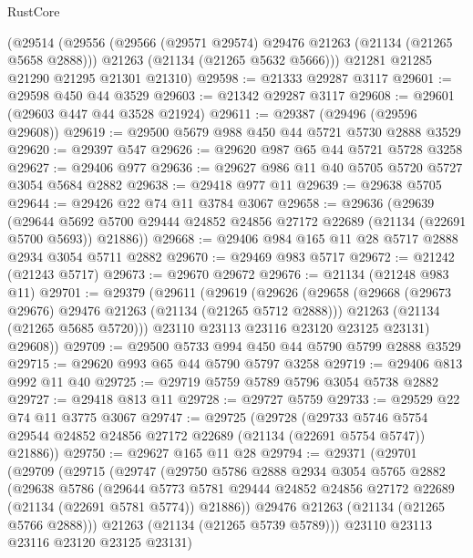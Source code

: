 \begin{lexlean}{RustCore}
\begin{coremodule}
    (@29514
      (@29556
        (@29566 (@29571 @29574) @29476 @21263 (@21134 (@21265 @5658 @2888)))
        @21263
        (@21134 (@21265 @5632 @5666)))
      @21281
      @21285
      @21290
      @21295
      @21301
      @21310)
@29598 := @21333 @29287 @3117
@29601 := @29598 @450 @44 @3529
@29603 := @21342 @29287 @3117
@29608 := @29601 (@29603 @447 @44 @3528 @21924)
@29611 := @29387 (@29496 (@29596 @29608))
@29619 := @29500 @5679 @988 @450 @44 @5721 @5730 @2888 @3529
@29620 := @29397 @547
@29626 := @29620 @987 @65 @44 @5721 @5728 @3258
@29627 := @29406 @977
@29636 := @29627 @986 @11 @40 @5705 @5720 @5727 @3054 @5684 @2882
@29638 := @29418 @977 @11
@29639 := @29638 @5705
@29644 := @29426 @22 @74 @11 @3784 @3067
@29658 := @29636
    (@29639
      (@29644 @5692 @5700 @29444 @24852 @24856 @27172 @22689 (@21134 (@22691 @5700 @5693)) @21886))
@29668 := @29406 @984 @165 @11 @28 @5717 @2888 @2934 @3054 @5711 @2882
@29670 := @29469 @983 @5717
@29672 := @21242 (@21243 @5717)
@29673 := @29670 @29672
@29676 := @21134 (@21248 @983 @11)
@29701 := @29379
    (@29611
      (@29619
        (@29626
          (@29658
            (@29668 (@29673 @29676) @29476 @21263 (@21134 (@21265 @5712 @2888)))
            @21263
            (@21134 (@21265 @5685 @5720)))
          @23110
          @23113
          @23116
          @23120
          @23125
          @23131)
        @29608))
@29709 := @29500 @5733 @994 @450 @44 @5790 @5799 @2888 @3529
@29715 := @29620 @993 @65 @44 @5790 @5797 @3258
@29719 := @29406 @813 @992 @11 @40
@29725 := @29719 @5759 @5789 @5796 @3054 @5738 @2882
@29727 := @29418 @813 @11
@29728 := @29727 @5759
@29733 := @29529 @22 @74 @11 @3775 @3067
@29747 := @29725
    (@29728
      (@29733 @5746 @5754 @29544 @24852 @24856 @27172 @22689 (@21134 (@22691 @5754 @5747)) @21886))
@29750 := @29627 @165 @11 @28
@29794 := @29371
    (@29701
      (@29709
        (@29715
          (@29747
            (@29750
              @5786
              @2888
              @2934
              @3054
              @5765
              @2882
              (@29638
                @5786
                (@29644
                  @5773
                  @5781
                  @29444
                  @24852
                  @24856
                  @27172
                  @22689
                  (@21134 (@22691 @5781 @5774))
                  @21886))
              @29476
              @21263
              (@21134 (@21265 @5766 @2888)))
            @21263
            (@21134 (@21265 @5739 @5789)))
          @23110
          @23113
          @23116
          @23120
          @23125
          @23131)

\end{coremodule}
\end{lexlean}
